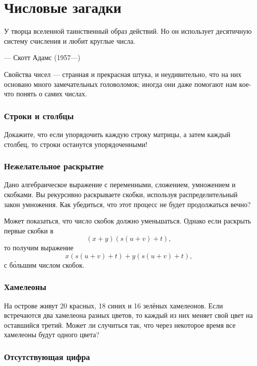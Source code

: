 \chapter{Числовые загадки}


\setlength{\epigraphwidth}{.85\textwidth}
\epigraph{У творца вселенной таинственный образ действий.
Но он использует десятичную систему счисления и любит круглые
числа.
}{--- Скотт Адамс (1957---)}


Свойства чисел --- странная и прекрасная штука, и неудивительно, что на них основано много замечательных головоломок; иногда они даже помогают нам кое-что понять о самих числах.

\subsection*{Строки и столбцы}

Докажите, что если упорядочить каждую строку матрицы, а затем каждый столбец, то строки останутся упорядоченными!

\subsection*{Нежелательное раскрытие}

Дано алгебраическое выражение с переменными, сложением, умножением и скобками.
Вы рекурсивно раскрываете скобки, используя распределительный закон умножения.
Как убедиться, что этот процесс не будет продолжаться вечно?

Может показаться, что число скобок должно уменьшаться.
Однако если раскрыть первые скобки в
\[(x + y)(s(u + v) + t),\]
то получим выражение
\[x(s(u + v) + t) + y(s(u + v) + t),\]
с б\'{о}льшим числом скобок.

\subsection*{Хамелеоны}\label{Хамелеоны}

На острове живут 20 красных, 18 синих и 16 зелёных хамелеонов.
Если встречаются два хамелеона разных цветов, то каждый из них меняет свой цвет на оставшийся третий.
Может ли случиться так, что через некоторое время все хамелеоны будут одного цвета? 

\subsection*{Отсутствующая цифра}

